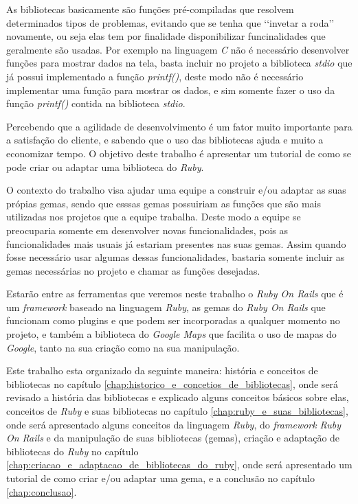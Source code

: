 As bibliotecas basicamente são funções pré-compiladas que resolvem determinados tipos de
problemas, evitando que se tenha que ‘‘invetar a roda’’ novamente, ou seja elas tem por 
finalidade disponibilizar funcinalidades que geralmente são usadas. Por exemplo 
na linguagem \emph{C} não é necessário desenvolver funções para mostrar dados na tela, basta 
incluir no projeto a biblioteca \emph{stdio} que já possui implementado a função 
\emph{printf()}, deste modo não é necessário implementar uma função para mostrar os 
dados, e sim somente fazer o uso da função \emph{printf()} contida na biblioteca \emph{stdio}.

Percebendo que a agilidade de desenvolvimento é um fator muito importante para a satisfação do 
cliente, e sabendo que o uso das bibliotecas ajuda e muito a economizar tempo. O objetivo 
deste trabalho é apresentar um tutorial de como se pode criar ou adaptar uma
biblioteca do \emph{Ruby}.

O contexto do trabalho visa ajudar uma equipe a construir e/ou adaptar
as suas própias gemas, sendo que esssas gemas possuiriam as funções que são 
mais utilizadas nos projetos que a equipe trabalha. Deste modo a equipe se preocuparia somente 
em desenvolver novas funcionalidades, pois as funcionalidades mais usuais já estariam 
presentes nas suas gemas. Assim quando fosse necessário usar algumas dessas 
funcionalidades, bastaria somente incluir as gemas necessárias no projeto e chamar as 
funções desejadas.

Estarão entre as ferramentas que veremos neste trabalho o \emph{Ruby On Rails} que é um 
\emph{framework} baseado na linguagem \emph{Ruby}, as gemas do \emph{Ruby On Rails} que 
funcionam como plugins e que podem ser incorporadas a qualquer momento no projeto, e também a 
biblioteca do \emph{Google Maps} que facilita o uso de mapas do \emph{Google}, tanto na sua 
criação como na sua manipulação.

Este trabalho esta organizado da seguinte maneira: história e conceitos de bibliotecas no 
capítulo \ref{chap:historico_e_concetios_de_bibliotecas}, onde será revisado a história 
das bibliotecas e explicado alguns conceitos básicos sobre elas, conceitos de 
\emph{Ruby} e suas bibliotecas no capítulo \ref{chap:ruby_e_suas_bibliotecas}, onde 
será apresentado alguns conceitos da linguagem \emph{Ruby}, do \emph{framework} 
\emph{Ruby On Rails} e da manipulação de suas bibliotecas (gemas), criação e adaptação
de bibliotecas do \emph{Ruby} no capítulo \ref{chap:criacao_e_adaptacao_de_bibliotecas_do_ruby}, 
onde será apresentado um tutorial de como criar e/ou adaptar uma gema, e a conclusão no 
capítulo \ref{chap:conclusao}.